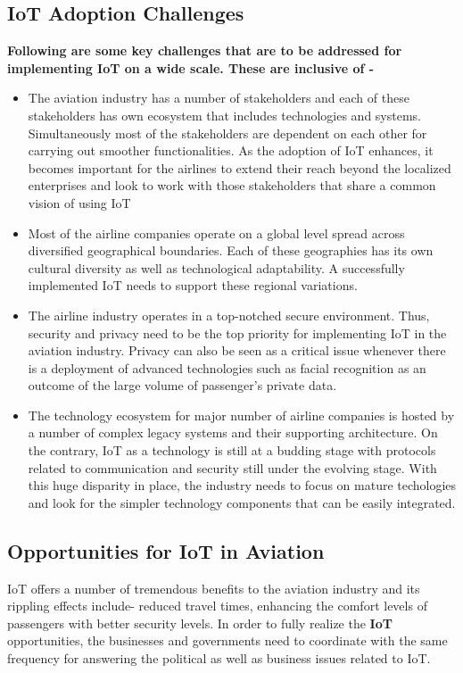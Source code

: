 \documentclass[a4paper,12pt]{article}
\begin{document}
\subsection{IoT Adoption Challenges}

\textbf{Following are some key challenges that are to be addressed for implementing IoT on a wide scale. These are inclusive of -}

\begin{itemize}
\item{ The aviation industry has a number of stakeholders and each of these stakeholders has own ecosystem that includes technologies and systems. Simultaneously most of the stakeholders are dependent on each other for carrying out smoother functionalities. As the adoption of IoT enhances, it becomes important for the airlines to extend their reach beyond the localized enterprises and look to work with those stakeholders that share a common vision of using IoT}
\item{ Most of the airline companies operate on a global level spread across diversified geographical boundaries. Each of these geographies has its own cultural diversity as well as technological adaptability. A successfully implemented IoT needs to support these regional variations.}
\item{ The airline industry operates in a top-notched secure environment. Thus, security and privacy need to be the top priority for implementing IoT in the aviation industry. Privacy can also be seen as a critical issue whenever there is a deployment of advanced technologies such as facial recognition as an outcome of the large volume of passenger’s private data.}
\item{ The technology ecosystem for major number of airline companies is hosted by a number of complex legacy systems and their supporting architecture. On the contrary, IoT as a technology is still at a budding stage with protocols related to communication and security still under the evolving stage. With this huge disparity in place, the industry needs to focus on mature techologies and look for the simpler technology components that can be easily integrated.}
\end{itemize}

\subsection{Opportunities for IoT in Aviation}

IoT offers a number of tremendous benefits to the aviation industry and its rippling effects include- reduced travel times, enhancing the comfort levels of passengers with better security levels. In order to fully realize the \textbf{IoT} opportunities, the businesses and governments need to coordinate with the same frequency for answering the political as well as business issues related to IoT.
\end{document}
